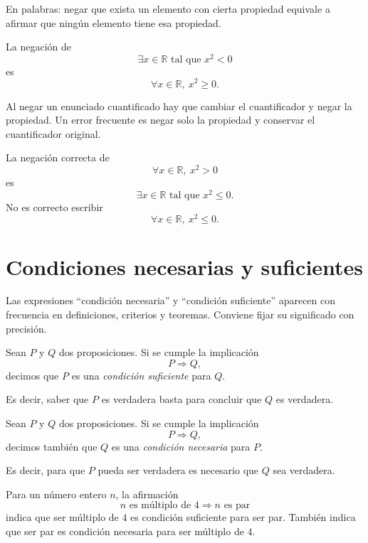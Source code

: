En palabras: negar que exista un elemento con cierta propiedad equivale a afirmar que ningún elemento tiene esa propiedad.

\begin{ejemplo}
La negación de
\[
  \exists x\in\mathbb{R} \text{ tal que } x^2<0
\]
es
\[
  \forall x\in\mathbb{R},\ x^2\geq 0.
\]
\end{ejemplo}

\begin{advertencia}
Al negar un enunciado cuantificado hay que cambiar el cuantificador y negar la propiedad. Un error frecuente es negar solo la propiedad y conservar el cuantificador original.
\end{advertencia}

\begin{ejemplo}
La negación correcta de
\[
  \forall x\in\mathbb{R},\ x^2>0
\]
es
\[
  \exists x\in\mathbb{R} \text{ tal que } x^2\leq 0.
\]
No es correcto escribir
\[
  \forall x\in\mathbb{R},\ x^2\leq 0.
\]
\end{ejemplo}

\section{Condiciones necesarias y suficientes}

Las expresiones ``condición necesaria'' y ``condición suficiente'' aparecen con frecuencia en definiciones, criterios y teoremas. Conviene fijar su significado con precisión.

\begin{definicion}
Sean $P$ y $Q$ dos proposiciones. Si se cumple la implicación
\[
  P\Rightarrow Q,
\]
decimos que $P$ es una \emph{condición suficiente} para $Q$.
\end{definicion}

Es decir, saber que $P$ es verdadera basta para concluir que $Q$ es verdadera.

\begin{definicion}
Sean $P$ y $Q$ dos proposiciones. Si se cumple la implicación
\[
  P\Rightarrow Q,
\]
decimos también que $Q$ es una \emph{condición necesaria} para $P$.
\end{definicion}

Es decir, para que $P$ pueda ser verdadera es necesario que $Q$ sea verdadera.

\begin{ejemplo}
Para un número entero $n$, la afirmación
\[
  n \text{ es múltiplo de }4 \Rightarrow n \text{ es par}
\]
indica que ser múltiplo de $4$ es condición suficiente para ser par. También indica que ser par es condición necesaria para ser múltiplo de $4$.
\end{ejemplo}

